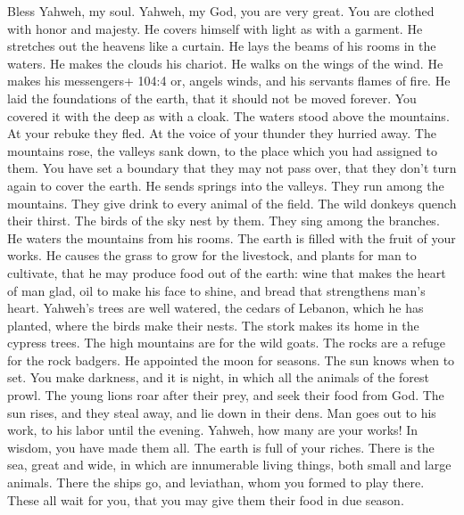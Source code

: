  Bless Yahweh, my soul. Yahweh, my God, you are very great.
You are clothed with honor and majesty.  He covers himself
with light as with a garment. He stretches out the heavens like a
curtain.  He lays the beams of his rooms in the waters. He
makes the clouds his chariot. He walks on the wings of the wind.
 He makes his messengers+ 104:4 or, angels winds, and his
servants flames of fire.  He laid the foundations of the
earth, that it should not be moved forever.  You covered it
with the deep as with a cloak. The waters stood above the mountains.
 At your rebuke they fled. At the voice of your thunder they
hurried away.  The mountains rose, the valleys sank down, to
the place which you had assigned to them.  You have set a
boundary that they may not pass over, that they don't turn again to
cover the earth.  He sends springs into the valleys. They
run among the mountains.  They give drink to every animal
of the field. The wild donkeys quench their thirst.  The
birds of the sky nest by them. They sing among the branches.
 He waters the mountains from his rooms. The earth is
filled with the fruit of your works.  He causes the grass
to grow for the livestock, and plants for man to cultivate, that he may
produce food out of the earth:  wine that makes the heart
of man glad, oil to make his face to shine, and bread that strengthens
man's heart.  Yahweh's trees are well watered, the cedars
of Lebanon, which he has planted,  where the birds make
their nests. The stork makes its home in the cypress trees.
 The high mountains are for the wild goats. The rocks are a
refuge for the rock badgers.  He appointed the moon for
seasons. The sun knows when to set.  You make darkness, and
it is night, in which all the animals of the forest prowl. 
The young lions roar after their prey, and seek their food from God.
 The sun rises, and they steal away, and lie down in their
dens.  Man goes out to his work, to his labor until the
evening.  Yahweh, how many are your works! In wisdom, you
have made them all. The earth is full of your riches. 
There is the sea, great and wide, in which are innumerable living
things, both small and large animals.  There the ships go,
and leviathan, whom you formed to play there.  These all
wait for you, that you may give them their food in due season.
